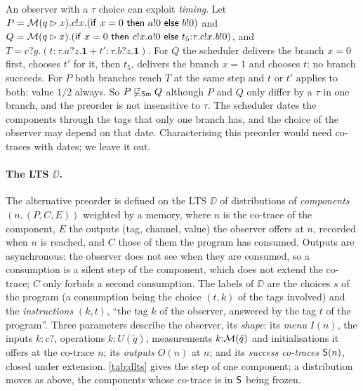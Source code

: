 \begin{remark}
An observer with a $\tau$ choice can exploit \emph{timing}. Let
$P = \mathcal{M}(q \rhd x).c!x.(\mathsf{if}\ x=0\ \mathsf{then}\ a!0\ \mathsf{else}\ b!0)$ and
$Q = \mathcal{M}(q \rhd x).(\mathsf{if}\ x=0\ \mathsf{then}\ c!x.a!0\ \mathsf{else}\ t_5{:}\tau.c!x.b!0)$, and
$T = c?y.(t{:}\tau.a?z.\mathbf{1} + t'{:}\tau.b?z.\mathbf{1})$. For $Q$
the scheduler delivers the branch $x=0$ first, chooses $t'$ for it, then
$t_5$, delivers the branch $x=1$ and chooses $t$: no branch succeeds. For $P$
both branches reach $T$ at the same step and $t$ or $t'$ applies to both:
value $1/2$ always. So $P \not\sqsubseteq_{\mathsf{Sm}} Q$ although $P$ and $Q$ only differ by
a $\tau$ in one branch, and the preorder is not insensitive to $\tau$. The
scheduler dates the components through the tags that only one branch has,
and the choice of the observer may depend on that date. Characterising this
preorder would need co-traces with dates; we leave it out.
\end{remark}

\paragraph{The LTS $\DD$.} The alternative preorder is defined on the
LTS $\DD$ of distributions of \emph{components} $(n, (P, C, E))$ weighted
by a memory, where $n$ is the co-trace of the component, $E$ the outputs
(tag, channel, value) the observer offers at $n$, recorded when $n$ is
reached, and $C$ those of them the program has consumed. Outputs are
asynchronous: the observer does not see when they are consumed, so a
consumption is a silent step of the component, which does not extend the
co-trace; $C$ only forbids a second consumption. The labels of $\DD$ are
the choices $s$ of the program (a consumption being the choice $(t,k)$ of
the tags involved) and the \emph{instructions} $(k, t)$, ``the tag $k$ of
the observer, answered by the tag $t$ of the program''. Three parameters
describe the observer, its \emph{shape}: its \emph{menu} $I(n)$, the inputs
$k{:}c?$, operations $k{:}U(\tilde q)$, measurements $k{:}\mathcal{M}(\tilde q)$ and
initialisations it offers at the co-trace $n$; its \emph{outputs} $O(n)$ at
$n$; and its \emph{success co-traces} $\mathsf{S}(n)$, closed under extension.
\cref{tab:dlts} gives the step of one component; a distribution moves as
above, the components whose co-trace is in $\mathsf{S}$ being frozen.

